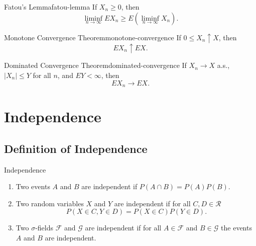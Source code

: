 \begin{theorem}{Fatou's Lemma}{fatou-lemma}
    If $X_n \geq 0$, then
    \begin{equation}
        \liminf _{n \rightarrow \infty} E X_{n} \geq E\left(\liminf _{n \rightarrow \infty} X_{n}\right).
    \end{equation}
\end{theorem}


\begin{theorem}{Monotone Convergence Theorem}{monotone-convergence}
    If $0 \leq X_{n} \uparrow X$, then
    \begin{equation}
        E X_{n} \uparrow E X.
    \end{equation}
\end{theorem}

\begin{theorem}{Dominated Convergence Theorem}{dominated-convergence}
    If $X_{n} \rightarrow X$ a.s., $\left|X_{n}\right| \leq Y$ for all $n$, and $E Y<\infty$, then
    \begin{equation}
        E X_{n} \rightarrow E X.
    \end{equation}
\end{theorem}

\section{Independence}

\subsection{Definition of Independence}

\begin{definition}{Independence}{}
    \begin{enumerate}
        \item Two events $A$ and $B$ are independent if $P(A \cap B)=P(A) P(B)$.
        \item Two random variables $X$ and $Y$ are independent if for all $C,D\in\mathcal{R}$
        \begin{equation}
            P(X\in C,Y\in D)=P(X\in C)P(Y\in D).
        \end{equation}
        \item Two $\sigma$-fields $\mathcal{F}$ and $\mathcal{G}$ are independent if for all $A\in\mathcal{F}$ and $B\in\mathcal{G}$ the events $A$ and $B$ are independent.
    \end{enumerate}
\end{definition}

